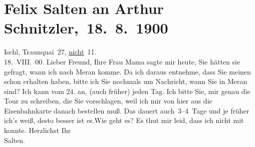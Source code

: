 

         
         \renewcommand{\erwaehntePersonen}{Personen: Caroline Kotter, Ottmar Peter Kotter, Elisabeth Kotter, Leopoldine Müller, Louise Schnitzler}
         \renewcommand{\erwaehnteOrte}{Orte: Bad Ischl, Meran, Schruns, Thusis, Traunkai}
         \renewcommand{\erwaehnteWerke}{}
               \section[ Felix Salten an Arthur Schnitzler, 18. 8. 1900]{ Felix Salten an Arthur Schnitzler, 18. 8. 1900}\nopagebreak{}\rehead{ }\begin{ledgroupsized}[t]{13cm}\normalsize\beginnumbering \toendnotes[C]{\smallbreak\pagebreak[2]} 
\toendnotes[C]{\smallbreak}\pstart
           \raggedleft{}{\pb}Ischl, Traunquai 27, \uline{nicht} 11. {\\}18. VIII. 00.\pend
           \pstart
           Lieber Freund, Ihre Frau Mama sagte mir heute, Sie
               hätten sie gefragt, wann ich nach Meran komme.
               Da ich daraus entnehme, dass Sie meinen \label{K_L03311-1v}\label{K_L03311-1h} schon erhalten haben, bitte ich Sie nochmals um Nachricht, wann Sie in Meran sind? Ich kann vom
                  24. an, (auch früher) jeden Tag. Ich bitte Sie, mir
               genau die Tour zu schreiben, die Sie vorschlagen, weil ich mir von hier aus die
               Eisenbahnkarte danach bestellen muß. Das dauert auch 3–4 Tage und je früher ich’s
               weiß, desto besser ist es.\hspace*{2em}Wie geht es? Es thut mir leid, dass ich nicht mit
               konnte.\pend
           \pstart
            Herzlichst Ihr {\\[\baselineskip]}\spacefill\mbox{Salten.}\pend

\end{ledgroupsized}
